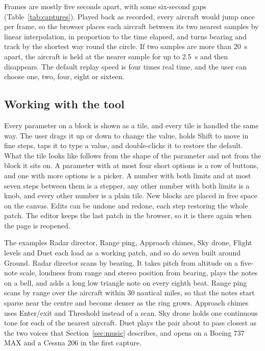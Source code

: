 \documentclass[11pt,letterpaper]{article}
\begin{document}
Frames are mostly five seconds apart, with some six-second gaps (Table~\ref{tab:captures}). Played back as recorded, every aircraft would jump once per frame, so the browser places each aircraft between its two nearest samples by linear interpolation, in proportion to the time elapsed, and turns bearing and track by the shortest way round the circle. If two samples are more than 20~s apart, the aircraft is held at the nearer sample for up to 2.5~s and then disappears. The default replay speed is four times real time, and the user can choose one, two, four, eight or sixteen.

\subsection{Working with the tool}

Every parameter on a block is shown as a tile, and every tile is handled the same way. The user drags it up or down to change the value, holds Shift to move in fine steps, taps it to type a value, and double-clicks it to restore the default. What the tile looks like follows from the shape of the parameter and not from the block it sits on. A parameter with at most four short options is a row of buttons, and one with more options is a picker. A number with both limits and at most seven steps between them is a stepper, any other number with both limits is a knob, and every other number is a plain tile. New blocks are placed in free space on the canvas. Edits can be undone and redone, each step restoring the whole patch. The editor keeps the last patch in the browser, so it is there again when the page is reopened.

The examples Radar director, Range ping, Approach chimes, Sky drone, Flight levels and Duet each load as a working patch, and so do seven built around Ground. Radar director scans by bearing. It takes pitch from altitude on a five-note scale, loudness from range and stereo position from bearing, plays the notes on a bell, and adds a long low triangle note on every eighth beat. Range ping scans by range over the aircraft within 30 nautical miles, so that the notes start sparse near the centre and become denser as the ring grows. Approach chimes uses Enter/exit and Threshold instead of a scan. Sky drone holds one continuous tone for each of the nearest aircraft. Duet plays the pair about to pass closest as the two voices that Section~\ref{sec:music} describes, and opens on a Boeing 737 MAX and a Cessna 206 in the first capture.
\end{document}
